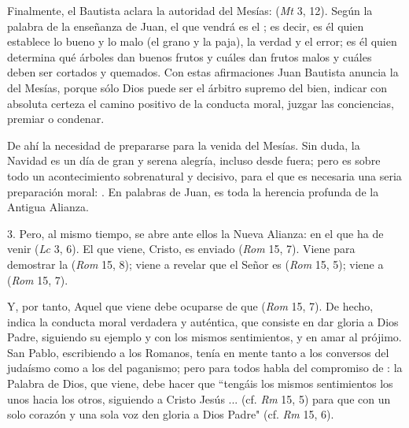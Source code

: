 \begin{body}
\begin{body}
		Finalmente, el Bautista aclara la autoridad del Mesías:  (\emph{Mt} 3, 12). Según la palabra de la enseñanza de Juan, el que vendrá es el ; es decir, es él quien establece lo bueno y lo malo (el grano y la paja), la verdad y el error; es él quien determina qué árboles dan buenos frutos y cuáles dan frutos malos y cuáles deben ser cortados y quemados. Con estas afirmaciones Juan Bautista anuncia la  del Mesías, porque sólo Dios puede ser el árbitro supremo del bien, indicar con absoluta certeza el camino positivo de la conducta moral, juzgar las conciencias, premiar o condenar.
		
		De ahí la necesidad de prepararse para la venida del Mesías. Sin duda, la Navidad es un día de gran y serena alegría, incluso desde fuera; pero es sobre todo un acontecimiento sobrenatural y decisivo, para el que es necesaria una seria preparación moral: . En palabras de Juan, es toda la herencia profunda de la Antigua Alianza.
		
		3. Pero, al mismo tiempo, se abre ante ellos la Nueva Alianza: en el que ha de venir  (\emph{Lc} 3, 6). El que viene, Cristo, es enviado  (\emph{Rom} 15, 7). Viene para demostrar la  (\emph{Rom} 15, 8); viene a revelar que el Señor es  (\emph{Rom} 15, 5); viene a  (\emph{Rom} 15, 7).
		
		Y, por tanto, Aquel que viene debe ocuparse de que  (\emph{Rom} 15, 7). De hecho, indica la conducta moral verdadera y auténtica, que consiste en dar gloria a Dios Padre, siguiendo su ejemplo y con los mismos sentimientos, y en amar al prójimo. San Pablo, escribiendo a los Romanos, tenía en mente tanto a los conversos del judaísmo como a los del paganismo; pero para todos habla del compromiso de : la Palabra de Dios, que viene, debe hacer que ``tengáis los mismos sentimientos los unos hacia los otros, siguiendo a Cristo Jesús ... (cf. \emph{Rm} 15, 5) para que con un solo corazón y una sola voz den gloria a Dios Padre" (cf. \emph{Rm} 15, 6).
		

\end{body}
\end{body}
